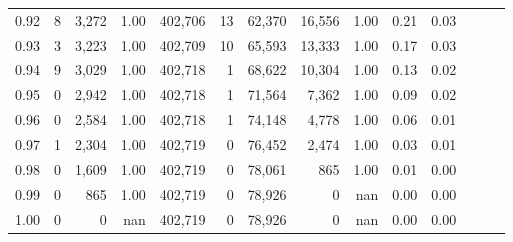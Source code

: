 \begin{tabular}{rrrrrrrrrrrrrr}
0.92 &      8 &  3,272 &  1.00 &  402,706 &       13 &  62,370 &  16,556 &  1.00 &  0.21 &      0.03 \\
0.93 &      3 &  3,223 &  1.00 &  402,709 &       10 &  65,593 &  13,333 &  1.00 &  0.17 &      0.03 \\
0.94 &      9 &  3,029 &  1.00 &  402,718 &        1 &  68,622 &  10,304 &  1.00 &  0.13 &      0.02 \\
0.95 &      0 &  2,942 &  1.00 &  402,718 &        1 &  71,564 &   7,362 &  1.00 &  0.09 &      0.02 \\
0.96 &      0 &  2,584 &  1.00 &  402,718 &        1 &  74,148 &   4,778 &  1.00 &  0.06 &      0.01 \\
0.97 &      1 &  2,304 &  1.00 &  402,719 &        0 &  76,452 &   2,474 &  1.00 &  0.03 &      0.01 \\
0.98 &      0 &  1,609 &  1.00 &  402,719 &        0 &  78,061 &     865 &  1.00 &  0.01 &      0.00 \\
0.99 &      0 &    865 &  1.00 &  402,719 &        0 &  78,926 &       0 &   nan &  0.00 &      0.00 \\
1.00 &      0 &      0 &   nan &  402,719 &        0 &  78,926 &       0 &   nan &  0.00 &      0.00 \\
\bottomrule
\end{tabular}
